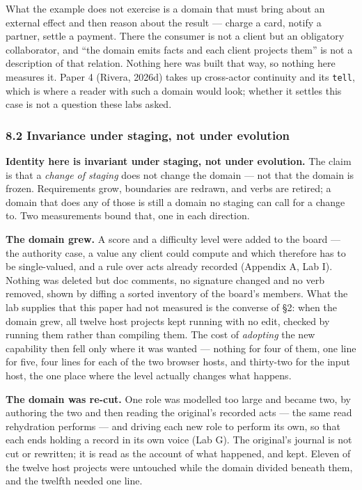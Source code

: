 \documentclass[
]{article}
\begin{document}
What the example does not exercise is a domain that must bring about an
external effect and then reason about the result --- charge a card,
notify a partner, settle a payment. There the consumer is not a client
but an obligatory collaborator, and ``the domain emits facts and each
client projects them'' is not a description of that relation. Nothing
here was built that way, so nothing here measures it. Paper 4 (Rivera,
2026d) takes up cross-actor continuity and its \texttt{tell}, which is
where a reader with such a domain would look; whether it settles this
case is not a question these labs asked.

\subsubsection{8.2 Invariance under staging, not under
evolution}\label{invariance-under-staging-not-under-evolution}

\textbf{Identity here is invariant under staging, not under evolution.}
The claim is that a \emph{change of staging} does not change the domain
--- not that the domain is frozen. Requirements grow, boundaries are
redrawn, and verbs are retired; a domain that does any of those is still
a domain no staging can call for a change to. Two measurements bound
that, one in each direction.

\textbf{The domain grew.} A score and a difficulty level were added to
the board --- the authority case, a value any client could compute and
which therefore has to be single-valued, and a rule over acts already
recorded (Appendix A, Lab I). Nothing was deleted but doc comments, no
signature changed and no verb removed, shown by diffing a sorted
inventory of the board's members. What the lab supplies that this paper
had not measured is the converse of §2: when the domain grew, all twelve
host projects kept running with no edit, checked by running them rather
than compiling them. The cost of \emph{adopting} the new capability then
fell only where it was wanted --- nothing for four of them, one line for
five, four lines for each of the two browser hosts, and thirty-two for
the input host, the one place where the level actually changes what
happens.

\textbf{The domain was re-cut.} One role was modelled too large and
became two, by authoring the two and then reading the original's
recorded acts --- the same read rehydration performs --- and driving
each new role to perform its own, so that each ends holding a record in
its own voice (Lab G). The original's journal is not cut or rewritten;
it is read as the account of what happened, and kept. Eleven of the
twelve host projects were untouched while the domain divided beneath
them, and the twelfth needed one line.
\end{document}
